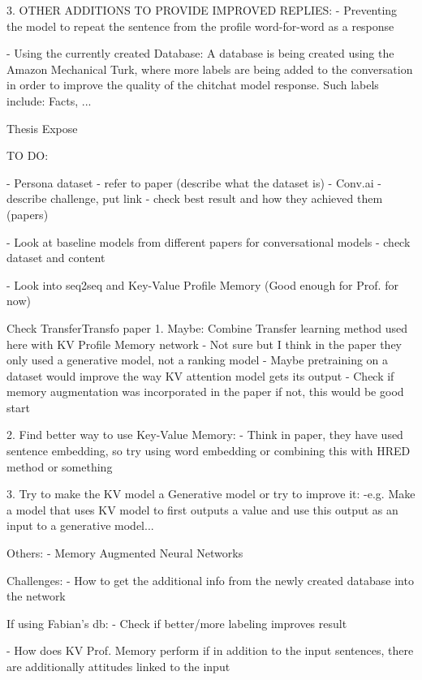 	
3. OTHER ADDITIONS TO PROVIDE IMPROVED REPLIES:
- Preventing the model to repeat the sentence from the profile word-for-word as a response

- Using the currently created Database: 
A database is being created using the Amazon Mechanical Turk, where more labels are being added to the conversation in order to improve the quality of the chitchat model response. Such labels include: Facts, ...







Thesis Expose

TO DO:

- Persona dataset - refer to paper (describe what the dataset is)
- Conv.ai - describe challenge, put link
- check best result and how they achieved them (papers)


- Look at baseline models from different papers for conversational models
- check dataset and content 

- Look into seq2seq and Key-Value Profile Memory (Good enough for Prof. for now)


Check TransferTransfo paper
1. Maybe: Combine Transfer learning method used here with KV Profile Memory network
- Not sure but I think in the paper they only used a generative model, not a ranking model
- Maybe pretraining on a dataset would improve the way KV attention model gets its output
- Check if memory augmentation was incorporated in the paper if not, this would be good start

2. Find better way to use Key-Value Memory:
- Think in paper, they have used sentence embedding, so try using word embedding or combining this with HRED method or something

3. Try to make the KV model a Generative model or try to improve it:
-e.g. Make a model that uses KV model to first outputs a value and use this output as an input to a generative model...


Others:
- Memory Augmented Neural Networks

Challenges:
- How to get the additional info from the newly created database into the network


If using Fabian's db:
- Check if better/more labeling improves result

- How does KV Prof. Memory perform if in addition to the input sentences, there are additionally attitudes linked to the input








